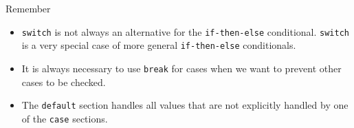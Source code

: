 \documentclass[10pt, compress]{beamer}
\begin{document}
\begin{slide}
	\begin{block}{Remember}
		\begin{itemize}
			\item[] \texttt{switch} is not always an alternative for the \texttt{if-then-else} conditional. \texttt{switch} is a very special case of more general \texttt{if-then-else} conditionals.
			\item[] It is always necessary to use \texttt{break} for cases when we want to prevent other cases to be checked.
			\item[] The \texttt{default} section handles all values that are not explicitly handled by one of the \texttt{case} sections.
		\end{itemize}
	\end{block}
\end{slide}

\end{document}
